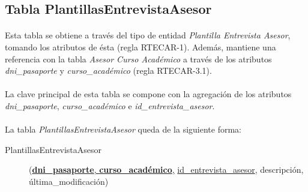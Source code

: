    \subsection{Tabla PlantillasEntrevistaAsesor}

      \paragraph{}Esta tabla se obtiene a través del tipo de entidad
      \textit{Plantilla Entrevista Asesor}, tomando los atributos de ésta
      (regla RTECAR-1). Además, mantiene una referencia con la tabla
      \textit{Asesor Curso Académico} a través de los atributos
      \textit{dni\_pasaporte} y \textit{curso\_académico} (regla RTECAR-3.1).

      \paragraph{}La clave principal de esta tabla se compone con la agregación
      de los atributos \textit{dni\_pasaporte}, \textit{curso\_académico} e
      \textit{id\_entrevista\_asesor}.

      \paragraph{}La tabla \textit{PlantillasEntrevistaAsesor} queda de la
      siguiente forma:

      \begin{description}
         \item[PlantillasEntrevistaAsesor] \begin{flushleft}(\underline{\textbf{dni\_pasaporte},
         \textbf{curso\_académico},} \underline{id\_entrevista\_asesor},
         descripción, última\_modificación)\end{flushleft}
      \end{description}
